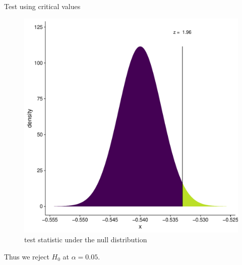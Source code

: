 \documentclass[10pt,handout]{beamer}\usepackage[]{graphicx}\usepackage[]{color}
\makeatletter
\def\maxwidth{ %
  \ifdim\Gin@nat@width>\linewidth
    \linewidth
  \else
    \Gin@nat@width
  \fi
}
\newenvironment{knitrout}{}{} %
\makeatother
\begin{document}
\begin{frame}[fragile]{Test using critical values}
\begin{minipage}{0.47\textwidth}
\begin{knitrout}
\begin{figure}
{\centering \includegraphics[width=\maxwidth]{figure/unnamed-chunk-6-1} 

}

\caption[test statistic under the null distribution]{test statistic under the null distribution}\label{fig:unnamed-chunk-6}
\end{figure}

\end{knitrout}
	\end{minipage}	
	
	Thus we reject $H_0$ at $\alpha = 0.05$.
\end{frame}
\end{document}
